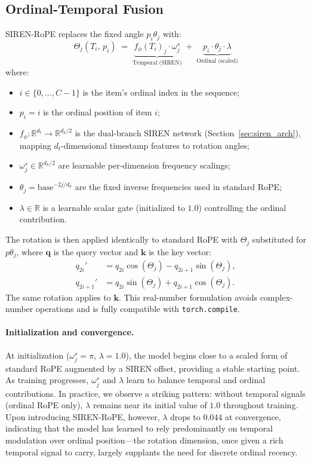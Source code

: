 \documentclass{article}
\begin{document}
\subsection{Ordinal-Temporal Fusion}

SIREN-RoPE replaces the fixed angle $p_i \theta_j$ with:
\begin{equation}
  \boxed{
    \Theta_j(T_i,\, p_i)
    \;=\;
    \underbrace{f_{\phi}(T_i)_j \cdot \omega^{s}_j}_{\text{Temporal (SIREN)}}
    \;+\;
    \underbrace{p_i \cdot \theta_j \cdot \lambda}_{\text{Ordinal (scaled)}}
  }
  \label{eq:siren_rope}
\end{equation}
where:
\begin{itemize}
  \item $i \in \{0,\ldots,C-1\}$ is the item's ordinal index in the sequence;
  \item $p_i = i$ is the ordinal position of item $i$;
  \item $f_{\phi}: \mathbb{R}^{d_t} \to \mathbb{R}^{d_k/2}$ is the
    dual-branch SIREN network (Section~\ref{sec:siren_arch}), mapping
    $d_t$-dimensional timestamp features to rotation angles;
  \item $\omega^{s}_j \in \mathbb{R}^{d_k/2}$ are learnable per-dimension
    frequency scalings;
  \item $\theta_j = \mathrm{base}^{-2j/d_k}$ are the fixed inverse frequencies
    used in standard RoPE;
  \item $\lambda \in \mathbb{R}$ is a learnable scalar gate (initialized
    to $1.0$) controlling the ordinal contribution.
\end{itemize}

The rotation is then applied identically to standard RoPE with $\Theta_j$
substituted for $p\theta_j$, where $\mathbf{q}$ is the query vector and
$\mathbf{k}$ is the key vector:
\begin{align}
  q_{2i}' &= q_{2i} \cos(\Theta_j) - q_{2i+1} \sin(\Theta_j),
  \label{eq:rot_cos}\\
  q_{2i+1}' &= q_{2i} \sin(\Theta_j) + q_{2i+1} \cos(\Theta_j).
  \label{eq:rot_sin}
\end{align}
The same rotation applies to $\mathbf{k}$. This real-number formulation avoids
complex-number operations and is fully compatible with \texttt{torch.compile}.

\paragraph{Initialization and convergence.} At initialization
($\omega^s_j = \pi$, $\lambda = 1.0$), the model begins close to a scaled
form of standard RoPE augmented by a SIREN offset, providing a stable
starting point. As training progresses, $\omega^s_j$ and $\lambda$ learn to
balance temporal and ordinal contributions. In practice,
we observe a striking pattern: without temporal signals (ordinal RoPE only),
$\lambda$ remains near its initial value of $1.0$ throughout training.
Upon introducing SIREN-RoPE, however, $\lambda$ drops to $0.044$ at convergence,
indicating that the model has learned to rely predominantly on temporal
modulation over ordinal position---the rotation dimension, once given a rich
temporal signal to carry, largely supplants the need for discrete ordinal
recency.
\end{document}

